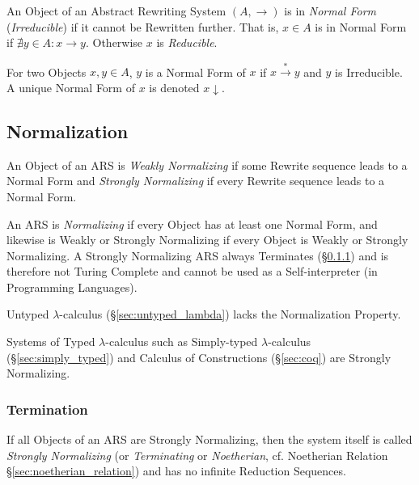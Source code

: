 An Object of an Abstract Rewriting System $(A,\rightarrow)$ is in
\emph{Normal Form} (\emph{Irreducible}) if it cannot be Rewritten
further. That is, $x \in A$ is in Normal Form if $\nexists y \in A : x
\rightarrow y$. Otherwise $x$ is \emph{Reducible}.

For two Objects $x,y \in A$, $y$ is a Normal Form of $x$ if $x
\stackrel{*}{\rightarrow} y$ and $y$ is Irreducible. A unique Normal
Form of $x$ is denoted $x \downarrow$.



\subsection{Normalization}\label{sec:normalization}

An Object of an ARS is \emph{Weakly Normalizing} if some Rewrite
sequence leads to a Normal Form and \emph{Strongly Normalizing} if
every Rewrite sequence leads to a Normal Form.

An ARS is \emph{Normalizing} if every Object has at least one Normal
Form, and likewise is Weakly or Strongly Normalizing if every Object
is Weakly or Strongly Normalizing. A Strongly Normalizing ARS always
Terminates (\S\ref{sec:termination}) and is therefore not Turing
Complete and cannot be used as a Self-interpreter (in Programming
Languages).

Untyped $\lambda$-calculus (\S\ref{sec:untyped_lambda}) lacks the
Normalization Property.

Systems of Typed $\lambda$-calculus such as Simply-typed
$\lambda$-calculus (\S\ref{sec:simply_typed}) and Calculus of
Constructions (\S\ref{sec:coq}) are Strongly Normalizing.



\subsubsection{Termination}\label{sec:termination}

If all Objects of an ARS are Strongly Normalizing, then the system
itself is called \emph{Strongly Normalizing} (or \emph{Terminating} or
\emph{Noetherian}, cf. Noetherian Relation
\S\ref{sec:noetherian_relation}) and has no infinite Reduction
Sequences.



